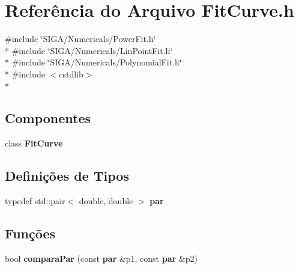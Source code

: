 \section{Referência do Arquivo Fit\+Curve.\+h}
\label{_fit_curve_8h}
{\ttfamily \#include \char`\"{}S\+I\+G\+A/\+Numericals/\+Power\+Fit.\+h\char`\"{}}\\*
{\ttfamily \#include \char`\"{}S\+I\+G\+A/\+Numericals/\+Lin\+Point\+Fit.\+h\char`\"{}}\\*
{\ttfamily \#include \char`\"{}S\+I\+G\+A/\+Numericals/\+Polynomial\+Fit.\+h\char`\"{}}\\*
{\ttfamily \#include $<$cstdlib$>$}\\*
\subsection*{Componentes}
\begin{DoxyCompactItemize}
\item 
class {\bf Fit\+Curve}
\end{DoxyCompactItemize}
\subsection*{Definições de Tipos}
\begin{DoxyCompactItemize}
\item 
typedef std\+::pair$<$ double, double $>$ {\bf par}
\end{DoxyCompactItemize}
\subsection*{Funções}
\begin{DoxyCompactItemize}
\item 
bool {\bf compara\+Par} (const {\bf par} \&p1, const {\bf par} \&p2)
\end{DoxyCompactItemize}
